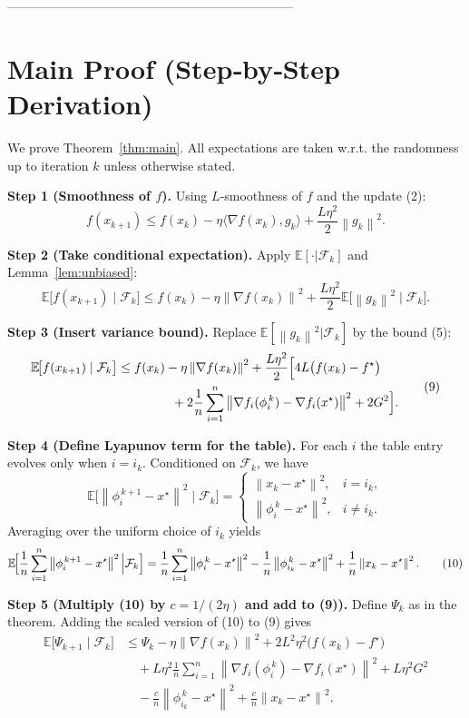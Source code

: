 \documentclass{article}
\newcommand{\E}{\mathbb{E}}
\newcommand{\norm}[1]{\left\lVert #1\right\rVert}
\newcommand{\grad}{\nabla}
\begin{document}
--------------------------------------------------------------------

\section*{Main Proof (Step‑by‑Step Derivation)}
We prove Theorem~\ref{thm:main}.  
All expectations are taken w.r.t. the randomness up to iteration $k$ unless otherwise stated.

\bigskip
\noindent\textbf{Step 1 (Smoothness of $f$).}  
Using $L$‑smoothness of $f$ and the update (2):
\[
f(x_{k+1})\le f(x_k)-\eta\langle\grad f(x_k),g_k\rangle+\frac{L\eta^{2}}{2}\norm{g_k}^{2}. \tag{7}
\]

\noindent\textbf{Step 2 (Take conditional expectation).}  
Apply $\E[\cdot|\mathcal{F}_k]$ and Lemma~\ref{lem:unbiased}:
\[
\E\!\bigl[f(x_{k+1})\mid\mathcal{F}_k\bigr]
   \le f(x_k)-\eta\norm{\grad f(x_k)}^{2}
      +\frac{L\eta^{2}}{2}\E\!\bigl[\norm{g_k}^{2}\mid\mathcal{F}_k\bigr]. \tag{8}
\]

\noindent\textbf{Step 3 (Insert variance bound).}  
Replace $\E[\norm{g_k}^{2}|\mathcal{F}_k]$ by the bound (5):
\[
\begin{aligned}
\E\!\bigl[f(x_{k+1})\mid\mathcal{F}_k\bigr]
   &\le f(x_k)-\eta\norm{\grad f(x_k)}^{2}
      +\frac{L\eta^{2}}{2}
        \Bigl[4L\bigl(f(x_k)-f^{\star}\bigr) \\
   &\qquad\qquad\; +2\frac{1}{n}\sum_{i=1}^{n}
        \norm{\grad f_i(\phi_i^{\,k})-\grad f_i(x^{\star})}^{2}+2G^{2}\Bigr].
\end{aligned} \tag{9}
\]

\noindent\textbf{Step 4 (Define Lyapunov term for the table).}  
For each $i$ the table entry evolves only when $i=i_k$.
Conditioned on $\mathcal{F}_k$, we have
\[
\E\!\bigl[\norm{\phi_{i}^{\,k+1}-x^{\star}}^{2}\mid\mathcal{F}_k\bigr]
   =\begin{cases}
      \norm{x_k-x^{\star}}^{2}, & i=i_k,\\[2mm]
      \norm{\phi_i^{\,k}-x^{\star}}^{2}, & i\neq i_k .
    \end{cases}
\]
Averaging over the uniform choice of $i_k$ yields
\[
\E\!\Bigl[\frac{1}{n}\sum_{i=1}^{n}\norm{\phi_i^{\,k+1}-x^{\star}}^{2}\Big|\mathcal{F}_k\Bigr]
   =\frac{1}{n}\sum_{i=1}^{n}\norm{\phi_i^{\,k}-x^{\star}}^{2}
     -\frac{1}{n}\norm{\phi_{i_k}^{\,k}-x^{\star}}^{2}
     +\frac{1}{n}\norm{x_k-x^{\star}}^{2}. \tag{10}
\]

\noindent\textbf{Step 5 (Multiply (10) by $c=1/(2\eta)$ and add to (9)).}  
Define $\Psi_k$ as in the theorem. Adding the scaled version of (10) to (9) gives
\[
\begin{aligned}
\E\!\bigl[\Psi_{k+1}\mid\mathcal{F}_k\bigr]
   &\le \Psi_k
      -\eta\norm{\grad f(x_k)}^{2}
      +2L^{2}\eta^{2}\bigl(f(x_k)-f^{\star}\bigr)\\
   &\quad +L\eta^{2}\frac{1}{n}\sum_{i=1}^{n}
        \norm{\grad f_i(\phi_i^{\,k})-\grad f_i(x^{\star})}^{2}
      +L\eta^{2}G^{2}\\
   &\quad -\frac{c}{n}\norm{\phi_{i_k}^{\,k}-x^{\star}}^{2}
      +\frac{c}{n}\norm{x_k-x^{\star}}^{2}.
\end{aligned} \tag{11}
\]
\end{document}
